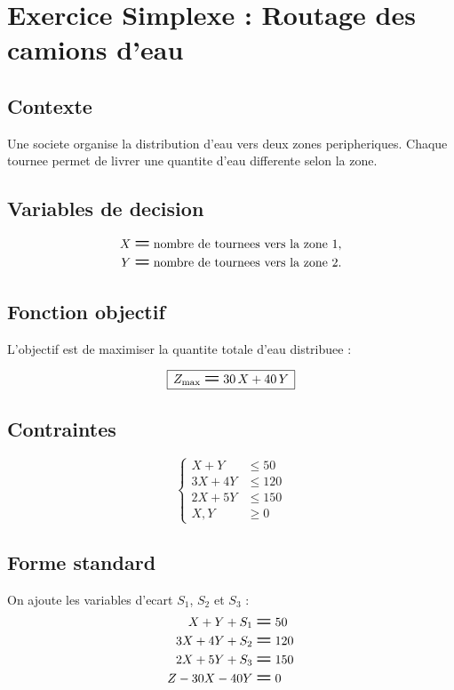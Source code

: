 \documentclass[12pt,a4paper]{article}
\newcommand{\Eq}{\mathrel{\text{\Large\bfseries =}}}
\newcommand{\Leq}{\leqslant}
\newcommand{\Geq}{\geqslant}
\newcommand{\BoxedEq}[1]{%
  \begin{equation*}
    \boxed{\,\displaystyle #1\,}
  \end{equation*}%
}
\begin{document}
\section*{Exercice Simplexe : Routage des camions d'eau}

\subsection*{Contexte}
Une societe organise la distribution d'eau vers deux zones peripheriques. Chaque tournee permet de livrer une quantite d'eau differente selon la zone.

\subsection*{Variables de decision}
\[
\begin{aligned}
X &\Eq \text{nombre de tournees vers la zone 1}, \\
Y &\Eq \text{nombre de tournees vers la zone 2}.
\end{aligned}
\]

\subsection*{Fonction objectif}
L'objectif est de maximiser la quantite totale d'eau distribuee :

\BoxedEq{Z_{\mathrm{max}} \Eq 30\,X + 40\,Y}

\subsection*{Contraintes}
\[
\left\{
\begin{aligned}
X + Y    &\Leq 50  \\
3X + 4Y  &\Leq 120 \\
2X + 5Y  &\Leq 150 \\
X, Y     &\Geq 0
\end{aligned}
\right.
\]

\subsection*{Forme standard}
On ajoute les variables d'ecart \(S_1\), \(S_2\) et \(S_3\) :
\[
\begin{aligned}
X + Y + S_1            &\Eq 50  \\
3X + 4Y + S_2          &\Eq 120 \\
2X + 5Y + S_3          &\Eq 150 \\
Z - 30X - 40Y          &\Eq 0
\end{aligned}
\]
\end{document}
